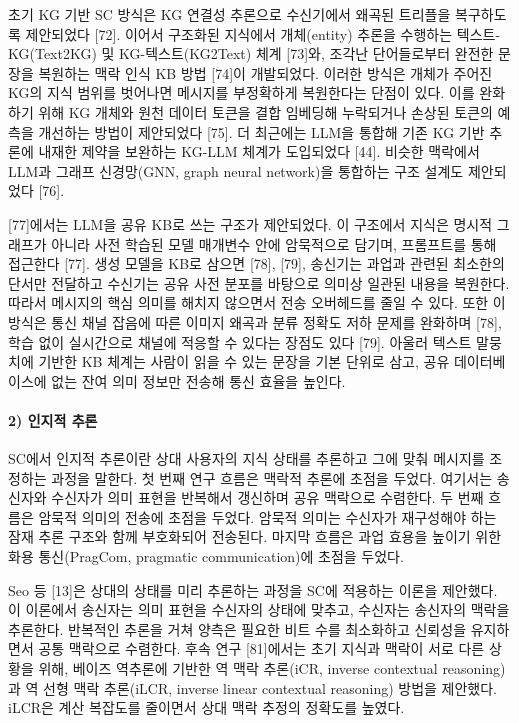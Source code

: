 초기 KG 기반 SC 방식은 KG 연결성 추론으로 수신기에서 왜곡된 트리플을 복구하도록 제안되었다 [72].
이어서 구조화된 지식에서 개체(entity) 추론을 수행하는 텍스트-KG(Text2KG) 및 KG-텍스트(KG2Text) 체계 [73]와, 조각난 단어들로부터 완전한 문장을 복원하는 맥락 인식 KB 방법 [74]이 개발되었다.
이러한 방식은 개체가 주어진 KG의 지식 범위를 벗어나면 메시지를 부정확하게 복원한다는 단점이 있다.
이를 완화하기 위해 KG 개체와 원천 데이터 토큰을 결합 임베딩해 누락되거나 손상된 토큰의 예측을 개선하는 방법이 제안되었다 [75].
더 최근에는 LLM을 통합해 기존 KG 기반 추론에 내재한 제약을 보완하는 KG-LLM 체계가 도입되었다 [44].
비슷한 맥락에서 LLM과 그래프 신경망(GNN, graph neural network)을 통합하는 구조 설계도 제안되었다 [76].

[77]에서는 LLM을 공유 KB로 쓰는 구조가 제안되었다.
이 구조에서 지식은 명시적 그래프가 아니라 사전 학습된 모델 매개변수 안에 암묵적으로 담기며, 프롬프트를 통해 접근한다 [77].
생성 모델을 KB로 삼으면 [78], [79], 송신기는 과업과 관련된 최소한의 단서만 전달하고 수신기는 공유 사전 분포를 바탕으로 의미상 일관된 내용을 복원한다. 따라서 메시지의 핵심 의미를 해치지 않으면서 전송 오버헤드를 줄일 수 있다.
또한 이 방식은 통신 채널 잡음에 따른 이미지 왜곡과 분류 정확도 저하 문제를 완화하며 [78], 학습 없이 실시간으로 채널에 적응할 수 있다는 장점도 있다 [79].
아울러 텍스트 말뭉치에 기반한 KB 체계는 사람이 읽을 수 있는 문장을 기본 단위로 삼고, 공유 데이터베이스에 없는 잔여 의미 정보만 전송해 통신 효율을 높인다.

\paragraph{2) 인지적 추론}
SC에서 인지적 추론이란 상대 사용자의 지식 상태를 추론하고 그에 맞춰 메시지를 조정하는 과정을 말한다.
첫 번째 연구 흐름은 맥락적 추론에 초점을 두었다. 여기서는 송신자와 수신자가 의미 표현을 반복해서 갱신하며 공유 맥락으로 수렴한다.
두 번째 흐름은 암묵적 의미의 전송에 초점을 두었다. 암묵적 의미는 수신자가 재구성해야 하는 잠재 추론 구조와 함께 부호화되어 전송된다.
마지막 흐름은 과업 효용을 높이기 위한 화용 통신(PragCom, pragmatic communication)에 초점을 두었다.

Seo 등 [13]은 상대의 상태를 미리 추론하는 과정을 SC에 적용하는 이론을 제안했다.
이 이론에서 송신자는 의미 표현을 수신자의 상태에 맞추고, 수신자는 송신자의 맥락을 추론한다.
반복적인 추론을 거쳐 양측은 필요한 비트 수를 최소화하고 신뢰성을 유지하면서 공통 맥락으로 수렴한다.
후속 연구 [81]에서는 초기 지식과 맥락이 서로 다른 상황을 위해, 베이즈 역추론에 기반한 역 맥락 추론(iCR, inverse contextual reasoning)과 역 선형 맥락 추론(iLCR, inverse linear contextual reasoning) 방법을 제안했다.
iLCR은 계산 복잡도를 줄이면서 상대 맥락 추정의 정확도를 높였다.

